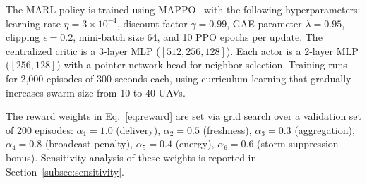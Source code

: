 \documentclass[5p,times]{elsarticle}
\begin{document}
The MARL policy is trained using MAPPO~\cite{yu2022mappo} with the following hyperparameters: learning rate $\eta = 3 \times 10^{-4}$, discount factor $\gamma = 0.99$, GAE parameter $\lambda = 0.95$, clipping $\epsilon = 0.2$, mini-batch size 64, and 10 PPO epochs per update. The centralized critic is a 3-layer MLP ($[512, 256, 128]$). Each actor is a 2-layer MLP ($[256, 128]$) with a pointer network head for neighbor selection. Training runs for 2,000 episodes of 300 seconds each, using curriculum learning that gradually increases swarm size from 10 to 40 UAVs.

The reward weights in Eq.~\eqref{eq:reward} are set via grid search over a validation set of 200 episodes: $\alpha_1 = 1.0$ (delivery), $\alpha_2 = 0.5$ (freshness), $\alpha_3 = 0.3$ (aggregation), $\alpha_4 = 0.8$ (broadcast penalty), $\alpha_5 = 0.4$ (energy), $\alpha_6 = 0.6$ (storm suppression bonus). Sensitivity analysis of these weights is reported in Section~\ref{subsec:sensitivity}.
\end{document}
